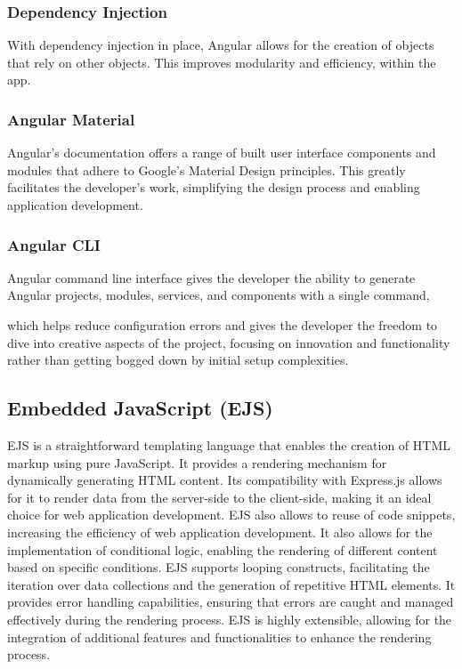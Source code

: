 \subsubsection{Dependency Injection}
With dependency injection in place, Angular allows for the creation of objects that rely on other objects. This improves modularity and efficiency, within the app.

\subsubsection{Angular Material}
Angular's documentation offers a range of built user interface components and modules that adhere to Google's Material Design principles. This greatly facilitates the developer's work, simplifying the design process and enabling application development.

\subsubsection{Angular CLI} Angular command line interface gives the developer the ability to generate Angular projects, modules, services, and components with a single command, 

which helps reduce configuration errors and gives the developer the freedom to dive into creative aspects of the project, focusing on innovation and functionality rather than getting bogged down by initial setup complexities.

\subsection{Embedded JavaScript (EJS)}
EJS is a straightforward templating language that enables the creation of HTML markup using pure JavaScript. It provides a rendering mechanism for dynamically generating HTML content.\cite{ejs}
Its compatibility with Express.js allows for it to render data from the server-side to the client-side, making it an ideal choice for web application development. 
EJS also allows to reuse of code snippets, increasing the efficiency of web application development. 
It also allows for the implementation of conditional logic, enabling the rendering of different content based on specific conditions. EJS supports looping constructs, facilitating the iteration over data collections 
and the generation of repetitive HTML elements. It provides error handling capabilities, ensuring that errors are caught and managed effectively during the rendering process. EJS is highly extensible,
allowing for the integration of additional features and functionalities to enhance the rendering process. \cite{ejs}

